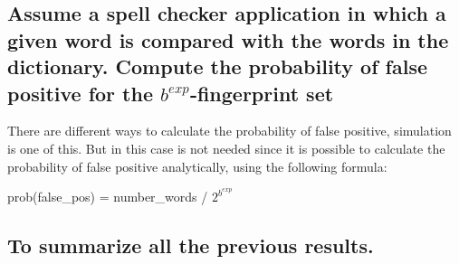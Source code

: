 \documentclass[twocolumn,letterpaper]{report}
\begin{document}
{			\subsection{Assume a spell checker application in which a given word is compared with the words in the dictionary. Compute the probability of false positive for the $b^{exp}$-fingerprint set}
			There are different ways to calculate the probability of false positive, simulation is one of this. But in this case is not needed since it is possible to calculate the probability of false positive analytically, using the following formula:
			\begin{center}
					prob(false\_pos) = number\_words / $2^{b^{exp}}$
			\end{center}
			
			\subsection{To summarize all the previous results.}

}
\end{document}
